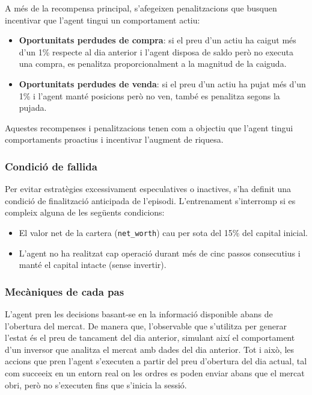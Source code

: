\documentclass[12pt,a4paper,twoside]{book}
\begin{document}
A més de la recompensa principal, s'afegeixen penalitzacions que busquen incentivar que l'agent tingui un comportament actiu:

\begin{itemize}
    \item \textbf{Oportunitats perdudes de compra}: si el preu d'un actiu ha caigut més d'un 1\% respecte al dia anterior i l'agent disposa de saldo però no executa una compra, es penalitza proporcionalment a la magnitud de la caiguda.

    \item \textbf{Oportunitats perdudes de venda}: si el preu d'un actiu ha pujat més d'un 1\% i l'agent manté posicions però no ven, també es penalitza segons la pujada.
\end{itemize}

Aquestes recompenses i penalitzacions tenen com a objectiu que l'agent tingui comportaments proactius i incentivar l'augment de riquesa.

\subsubsection*{Condició de fallida}

Per evitar estratègies excessivament especulatives o inactives, s'ha definit una condició de finalització anticipada de l'episodi. L'entrenament s'interromp si es compleix alguna de les següents condicions:

\begin{itemize}
    \item El valor net de la cartera (\texttt{net\_worth}) cau per sota del 15\% del capital inicial.
    \item L'agent no ha realitzat cap operació durant més de cinc passos consecutius i manté el capital intacte (sense invertir).
\end{itemize}


\subsubsection{Mecàniques de cada pas}

L'agent pren les decisions basant-se en la informació disponible abans de l'obertura del mercat. De manera que, l'observable que s'utilitza per generar l'estat és el preu de tancament del dia anterior, simulant així el comportament d'un inversor que analitza el mercat amb dades del dia anterior. Tot i això, les accions que pren l'agent s'executen a partir del preu d'obertura del dia actual, tal com succeeix en un entorn real on les ordres es poden enviar abans que el mercat obri, però no s'executen fins que s'inicia la sessió.
\end{document}
